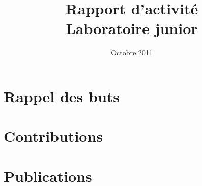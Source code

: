 \documentclass[11pt]{article}
\title{Rapport d'activité\\
Laboratoire junior \coqtail{}}
\date{Octobre 2011}
\begin{document}
\maketitle

\section{Rappel des buts}

\section{Contributions}

\section{Publications}
\end{document}
